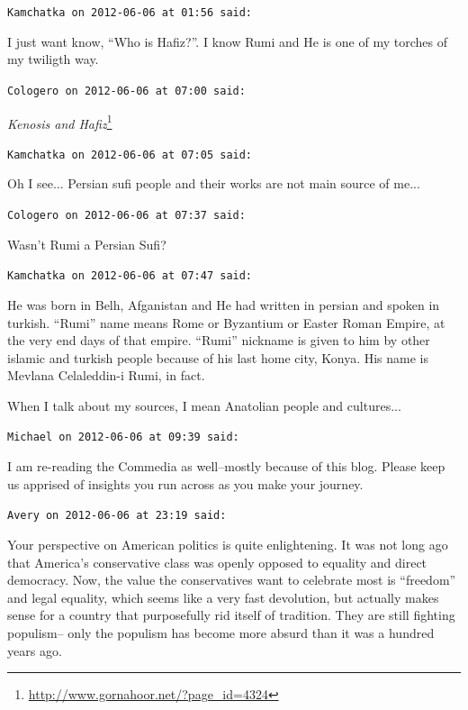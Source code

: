 \begin{footnotesize}
\begin{sffamily}
\texttt{Kamchatka on 2012-06-06 at 01:56 said:}

I just want know, ``Who is Hafiz?''. I know Rumi and He is one of my torches of my twiligth way.

\hfill

\texttt{Cologero on 2012-06-06 at 07:00 said:}

\textit{Kenosis and Hafiz}\footnote{\url{http://www.gornahoor.net/?page\_id=4324}}


\hfill

\texttt{Kamchatka on 2012-06-06 at 07:05 said:}

Oh I see... Persian sufi people and their works are not main source of me... 

\hfill

\texttt{Cologero on 2012-06-06 at 07:37 said:}

Wasn't Rumi a Persian Sufi?

\hfill

\texttt{Kamchatka on 2012-06-06 at 07:47 said:}

He was born in Belh, Afganistan and He had written in persian and spoken in turkish. ``Rumi'' name means Rome or Byzantium or Easter Roman Empire, at the very end days of that empire. ``Rumi'' nickname is given to him by other islamic and turkish people because of his last home city, Konya. His name is Mevlana Celaleddin-i Rumi, in fact.

When I talk about my sources, I mean Anatolian people and cultures... 

\hfill

\texttt{Michael on 2012-06-06 at 09:39 said:}

I am re-reading the Commedia as well--mostly because of this blog. Please keep us apprised of insights you run across as you make your journey.

\hfill

\texttt{Avery on 2012-06-06 at 23:19 said:}

Your perspective on American politics is quite enlightening. It was not long ago that America's conservative class was openly opposed to equality and direct democracy. Now, the value the conservatives want to celebrate most is ``freedom'' and legal equality, which seems like a very fast devolution, but actually makes sense for a country that purposefully rid itself of tradition. They are still fighting populism-- only the populism has become more absurd than it was a hundred years ago.

\end{sffamily}
\end{footnotesize}

